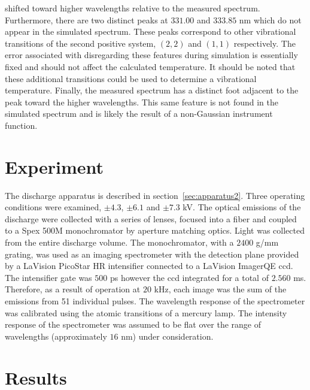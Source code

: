 shifted toward higher wavelengths relative to the measured spectrum.
Furthermore, there are two distinct peaks at $331.00$ and $333.85$ nm which do
not appear in the simulated spectrum. These peaks correspond to other
vibrational transitions of the second positive system, $(2,2)$ and $(1,1)$
respectively. The error associated with disregarding these features during
simulation is essentially fixed and should not affect the calculated
temperature. It should be noted that these additional transitions could be used
to determine a vibrational temperature. Finally, the measured spectrum has a
distinct foot adjacent to the peak toward the higher wavelengths. This same
feature is not found in the simulated spectrum and is likely the result of a
non-Gaussian instrument function. 

\section{Experiment}

The discharge apparatus is described in section~\ref{sec:apparatus2}. Three
operating conditions were examined, $\pm4.3$, $\pm6.1$ and $\pm7.3$ kV. The
optical emissions of the discharge were collected with a series of lenses,
focused into a fiber and coupled to a Spex 500M monochromator by aperture
matching optics. Light was collected from the entire discharge volume. The
monochromator, with a $2400$ g/mm grating, was used as an imaging spectrometer
with the detection plane provided by a LaVision PicoStar HR intensifier
connected to a LaVision ImagerQE \acs{ccd}. The intensifier gate was $500$ ps
however the \acs{ccd} integrated for a total of $2.560$ ms. Therefore, as a
result of operation at $20$ kHz, each image was the sum of the emissions from 51
individual pulses. The wavelength response of the spectrometer was calibrated
using the atomic transitions of a mercury lamp. The intensity response of the
spectrometer was assumed to be flat over the range of wavelengths (approximately
$16$ nm) under consideration.

\section{Results}

